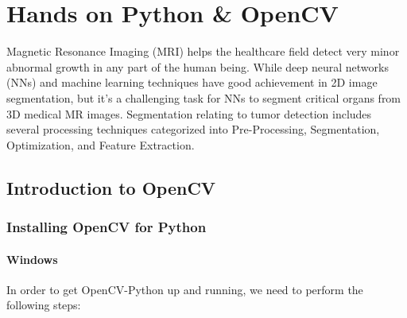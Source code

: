 \chapter{Hands on Python \& OpenCV}
\label{sec:chap6}
Magnetic Resonance Imaging (MRI) helps the healthcare field detect very minor abnormal growth in any part of the human being. While deep neural networks (NNs) and machine learning techniques have good achievement in 2D image segmentation, but it’s a challenging task for NNs to segment critical organs from 3D medical MR images. Segmentation relating to tumor detection includes several processing techniques categorized into Pre-Processing, Segmentation, Optimization, and Feature Extraction.

\section{Introduction to OpenCV}

\subsection{Installing OpenCV for Python}

\subsubsection{Windows}

In order to get OpenCV-Python up and running, we need to perform the following steps:

